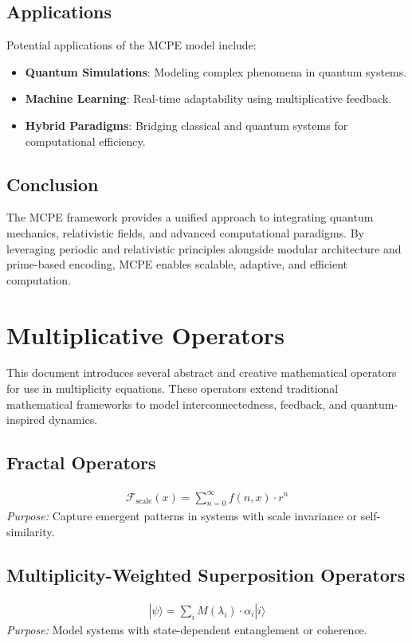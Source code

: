 \documentclass{article}
\theoremstyle{plain}
\begin{document}
\subsection{Applications}
Potential applications of the MCPE model include:
\begin{itemize}
    \item \textbf{Quantum Simulations}: Modeling complex phenomena in quantum systems.
    \item \textbf{Machine Learning}: Real-time adaptability using multiplicative feedback.
    \item \textbf{Hybrid Paradigms}: Bridging classical and quantum systems for computational efficiency.
\end{itemize}

\subsection{Conclusion}
The MCPE framework provides a unified approach to integrating quantum mechanics, relativistic fields, and advanced computational paradigms. By leveraging periodic and relativistic principles alongside modular architecture and prime-based encoding, MCPE enables scalable, adaptive, and efficient computation.

\section{Multiplicative Operators}

This document introduces several abstract and creative mathematical operators for use in multiplicity equations. These operators extend traditional mathematical frameworks to model interconnectedness, feedback, and quantum-inspired dynamics.

\subsection{Fractal Operators}
    \begin{align}
        \mathcal{F}_{\text{scale}}(x) = \sum_{n=0}^\infty f(n, x) \cdot r^n
    \end{align}
    \textit{Purpose:} Capture emergent patterns in systems with scale invariance or self-similarity.

    \subsection{Multiplicity-Weighted Superposition Operators}
    \begin{align}
        |\psi\rangle = \sum_i M(\lambda_i) \cdot \alpha_i |i\rangle
    \end{align}
    \textit{Purpose:} Model systems with state-dependent entanglement or coherence.
\end{document}
